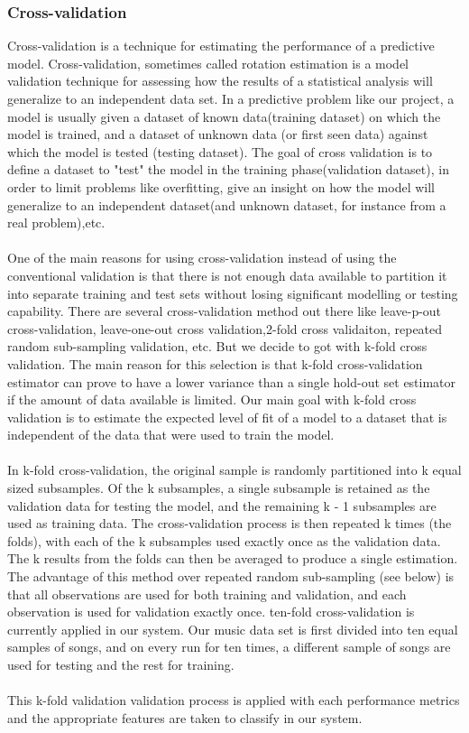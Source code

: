 \subsubsection{Cross-validation}
Cross-validation is a technique for estimating the performance of a predictive model.
Cross-validation, sometimes called rotation estimation is a model validation technique for assessing how the
results of a statistical analysis will generalize to an independent data set. In a predictive problem like our project, a model is usually given a dataset of known data(training dataset) on which 
the model is trained, and a dataset of unknown data (or first seen data) against which the model is tested (testing dataset). The goal of cross validation is to define a dataset
to "test" the model in the training phase(validation dataset), in order to limit problems like overfitting, give an insight on how the model will generalize to an independent dataset(and unknown dataset, for instance from 
a real problem),etc.\\
\\
One of the main reasons for using cross-validation instead of using the conventional validation is that there is not enough data available to partition it into separate training and test sets without losing
significant modelling or testing capability. There are several cross-validation method out there like leave-p-out cross-validation, leave-one-out cross validation,2-fold cross validaiton, repeated random 
sub-sampling validation, etc. But we decide to got with k-fold cross validation. The main reason for this selection is that k-fold cross-validation estimator can prove to have a lower variance than a single hold-out set 
estimator if the amount of data available is limited. Our main goal with k-fold cross validation is to estimate the expected level of fit of a model to a dataset that is independent of the data that were
used to train the model.\\
\\
In k-fold cross-validation, the original sample is randomly partitioned into k equal sized subsamples. Of the k subsamples,
a single subsample is retained as the validation data for testing the model, and the remaining k - 1 subsamples are used as training
data. The cross-validation process is then repeated k times (the folds), with each of the k subsamples used exactly once as the validation data. The k results from the
folds can then be averaged to produce a single estimation. The advantage of this method over repeated random sub-sampling (see below) is that all
observations are used for both training and validation, and each observation is used for validation exactly once. ten-fold cross-validation is currently
applied in our system. Our music data set is first divided into ten equal samples of songs, and on every run for ten times, a different sample of songs are used for
testing and the rest for training.\\
\\
This k-fold validation validation process is applied with each performance metrics and the appropriate features are taken to classify in our system.

